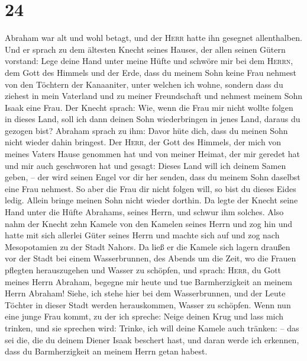 \hypertarget{section-23}{%
\section{24}\label{section-23}}

 Abraham war alt und wohl betagt, und der \textsc{Herr}
hatte ihn gesegnet allenthalben.  Und er sprach zu dem
ältesten Knecht seines Hauses, der allen seinen Gütern vorstand: Lege
deine Hand unter meine Hüfte  und schwöre mir bei dem
\textsc{Herrn}, dem Gott des Himmels und der Erde, dass du meinem Sohn
keine Frau nehmest von den Töchtern der Kanaaniter, unter welchen ich
wohne,  sondern dass du ziehest in mein Vaterland und zu
meiner Freundschaft und nehmest meinem Sohn Isaak eine Frau.
 Der Knecht sprach: Wie, wenn die Frau mir nicht wollte
folgen in dieses Land, soll ich dann deinen Sohn wiederbringen in jenes
Land, daraus du gezogen bist?  Abraham sprach zu ihm:
Davor hüte dich, dass du meinen Sohn nicht wieder dahin bringest.
 Der \textsc{Herr}, der Gott des Himmels, der mich von
meines Vaters Hause genommen hat und von meiner Heimat, der mir geredet
hat und mir auch geschworen hat und gesagt: Dieses Land will ich deinem
Samen geben, -- der wird seinen Engel vor dir her senden, dass du meinem
Sohn daselbst eine Frau nehmest.  So aber die Frau dir
nicht folgen will, so bist du dieses Eides ledig. Allein bringe meinen
Sohn nicht wieder dorthin.  Da legte der Knecht seine Hand
unter die Hüfte Abrahams, seines Herrn, und schwur ihm solches.
 Also nahm der Knecht zehn Kamele von den Kamelen seines
Herrn und zog hin und hatte mit sich allerlei Güter seines Herrn und
machte sich auf und zog nach Mesopotamien zu der Stadt Nahors.
 Da ließ er die Kamele sich lagern draußen vor der Stadt
bei einem Wasserbrunnen, des Abends um die Zeit, wo die Frauen pflegten
herauszugehen und Wasser zu schöpfen,  und sprach:
\textsc{Herr}, du Gott meines Herrn Abraham, begegne mir heute und tue
Barmherzigkeit an meinem Herrn Abraham!  Siehe, ich stehe
hier bei dem Wasserbrunnen, und der Leute Töchter in dieser Stadt werden
herauskommen, Wasser zu schöpfen.  Wenn nun eine junge
Frau kommt, zu der ich spreche: Neige deinen Krug und lass mich trinken,
und sie sprechen wird: Trinke, ich will deine Kamele auch tränken: --
das sei die, die du deinem Diener Isaak beschert hast, und daran werde
ich erkennen, dass du Barmherzigkeit an meinem Herrn getan habest.
